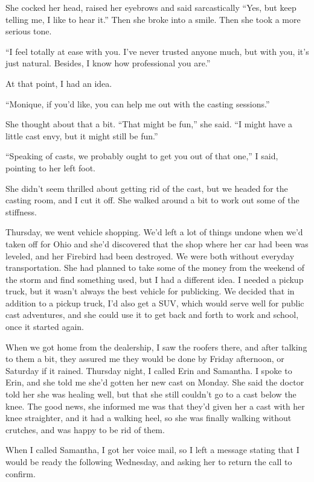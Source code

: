 She cocked her head, raised her eyebrows and said sarcastically ``Yes, but keep telling me,
I like to hear it.'' Then she broke into a smile. Then she took a more serious tone.

``I feel totally at ease with you. I've never trusted anyone much, but with you, it's just
natural. Besides, I know how professional you are.''

At that point, I had an idea.

``Monique, if you'd like, you can help me out with the casting sessions.''

She thought about that a bit. ``That might be fun,'' she said. ``I might have a little cast
envy, but it might still be fun.''

``Speaking of casts, we probably ought to get you out of that one,'' I said, pointing to her
left foot.

She didn't seem thrilled about getting rid of the cast, but we headed for the casting room,
and I cut it off. She walked around a bit to work out some of the stiffness.

Thursday, we went vehicle shopping. We'd left a lot of things undone when we'd taken off
for Ohio and she'd discovered that the shop where her car had been was leveled, and her Firebird
had been destroyed. We were both without everyday transportation. She had planned to take some
of the money from the weekend of the storm and find something used, but I had a different idea.
I needed a pickup truck, but it wasn't always the best vehicle for publicking. We decided that
in addition to a pickup truck, I'd also get a SUV, which would serve well for public cast
adventures, and she could use it to get back and forth to work and school, once it started
again.

When we got home from the dealership, I saw the roofers there, and after talking to them a
bit, they assured me they would be done by Friday afternoon, or Saturday if it rained. Thursday
night, I called Erin and Samantha. I spoke to Erin, and she told me she'd gotten her new cast on
Monday. She said the doctor told her she was healing well, but that she still couldn't go to a
cast below the knee. The good news, she informed me was that they'd given her a cast with her
knee straighter, and it had a walking heel, so she was finally walking without crutches, and was
happy to be rid of them.

When I called Samantha, I got her voice mail, so I left a message stating that I would be
ready the following Wednesday, and asking her to return the call to confirm.

